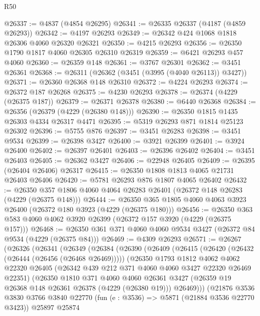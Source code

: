 \begin{lexlean}{R50}
\begin{coremodule}
@26337 := @4837 (@4854 @26295)
@26341 := @26335 @26337 (@4187 (@4859 @26293))
@26342 := @4197 @26293
@26349 := @26342 @424 @1068 @1818 @26306 @4060 @26320 @26321
@26350 := @4215 @26293
@26356 := @26350 @1790 @1817 @4060 @26305 @26310 @26319
@26359 := @6421 @26293 @457 @4060
@26360 := @26359 @148
@26361 := @3767 @26301
@26362 := @3451 @26361
@26368 := @26311 (@26362 (@3451 (@3995 (@4040 @26113)) @3427))
@26371 := @26360 @26368 @148 @26310
@26372 := @4224 @26293
@26374 := @26372 @187 @26268
@26375 := @4230 @26293
@26378 := @26374 (@4229 (@26375 @187))
@26379 := @26371 @26378
@26380 := @6440 @26368
@26384 := @26356 (@26379 (@4229 (@26380 @148)))
@26390 := @26350 @1815 @1435 @26303 @4334 @26317 @4471
@26395 := @5319 @26293 @871 @1814 @25123 @26302
@26396 := @5755 @876
@26397 := @3451 @26283
@26398 := @3451 @9534
@26399 := @26398 @3427
@26400 := @3921 @26399
@26401 := @3924 @26400
@26402 := @26397 @26401
@26403 := @26396 @26402
@26404 := @3451 @26403
@26405 := @26362 @3427
@26406 := @22948 @26405
@26409 := @26395 (@26404 @26406) @26317
@26415 := @26350 @1808 @1813 @4065 @21731 @26403 @26406
@26420 := @5781 @26293 @876 @1807 @4065 @26402
@26432 := @26350 @357 @1806 @4060 @4064 @26283 @26401 (@26372 @148 @26283 (@4229 (@26375 @148)))
@26444 := @26350 @365 @1805 @4060 @4063 @3923 @26400 (@26372 @180 @3923 (@4229 (@26375 @180)))
@26456 := @26350 @363 @583 @4060 @4062 @3920 @26399 (@26372 @157 @3920 (@4229 (@26375 @157)))
@26468 := @26350 @361 @371 @4060 @4060 @9534 @3427 (@26372 @84 @9534 (@4229 (@26375 @84)))
@26469 := @4309 @26293
@26571 := @26267
    (@26326
      (@26341
        (@26349
          (@26384
            (@26390
              (@26409
                (@26415
                  (@26420 (@26432 (@26444 (@26456 (@26468 @26469)))))
                  (@26350
                    @1793
                    @1812
                    @4062
                    @4062
                    @22320
                    @26405
                    (@26342 @439 @212 @371 @4060 @4060 @3427 @22320 @26469 @22351)
                    (@26350
                      @1810
                      @371
                      @4060
                      @4060
                      @26361
                      @3427
                      (@26359 @19 @26368 @148 @26361 @26378 (@4229 (@26380 @19)))
                      @26469)))
                (@21876
                  @3536
                  @3830
                  @3766
                  @3840
                  @22770
                  (fun (e : @3536) => @5871 (@21884 @3536 @22770 @3423))
                  @25897
                  @25874

\end{coremodule}
\end{lexlean}
